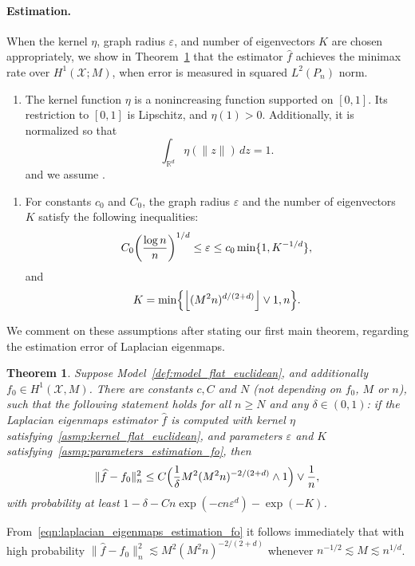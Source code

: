 \documentclass{article}
\newcommand{\Reals}{\mathbb{R}}
\newcommand{\floor}[1]{\left\lfloor #1 \right\rfloor}
\newcommand{\1}{\mathbf{1}}
\newcommand{\Rd}{\Reals^d}
\newcommand{\mc}[1]{\mathcal{#1}}
\newcommand{\wh}[1]{\widehat{#1}}
\theoremstyle{alden}
\theoremstyle{aldenthm}
\newtheorem{theorem}{Theorem}
\theoremstyle{definition}
\theoremstyle{remark}
\begin{document}
\paragraph{Estimation.} When the kernel $\eta$, graph radius $\varepsilon$, and number of eigenvectors $K$ are chosen appropriately, we show in Theorem~\ref{thm:laplacian_eigenmaps_estimation_fo} that the estimator $\wh{f}$ achieves the minimax rate over $H^1(\mc{X};M)$, when error is measured in squared $L^2(P_n)$ norm.
\begin{enumerate}[label=(K\arabic*)]
	\setcounter{enumi}{0}
	\item
	\label{asmp:kernel_flat_euclidean}
	The kernel function $\eta$ is a nonincreasing function supported on $[0,1]$. Its restriction to $[0,1]$ is Lipschitz, and $\eta(1) > 0$. Additionally, it is normalized so that
	\begin{equation*}
	\int_{\Rd} \eta(\|z\|) \,dz = 1.
	\end{equation*}
	and we assume \smash{$\sigma_{\eta} := \frac{1}{d}\int_{\Rd} \|x\|^2 \eta(\|x\|) \,dx < \infty$}.
\end{enumerate}
\begin{enumerate}[label=(P\arabic*)]
	\setcounter{enumi}{0}
	\item 
	\label{asmp:parameters_estimation_fo} 
	For constants $c_0$ and $C_0$, the graph radius $\varepsilon$ and the number of eigenvectors $K$ satisfy the following inequalities:
	\begin{equation}\\
	\label{eqn:radius_fo} 
	C_0\biggl(\frac{\log n}{n}\biggr)^{1/d} \leq \varepsilon \leq c_0\min\{1,K^{-1/d}\},
	\end{equation}
	and 
	\begin{equation}
	\label{eqn:eigenvector_estimation_fo} 
	K = \min\Bigl\{\floor{(M^2n)^{d/(2 + d)}} \vee 1, n\Bigr\}.
	\end{equation}
\end{enumerate}
We comment on these assumptions after stating our first main theorem, regarding the estimation error of Laplacian eigenmaps.
\begin{theorem}
	\label{thm:laplacian_eigenmaps_estimation_fo}
	Suppose Model~\ref{def:model_flat_euclidean}, and additionally $f_0 \in H^1(\mc{X},M)$. There are constants $c,C$ and $N$ (not depending on $f_0$, $M$ or $n$), such that the following statement holds for all $n \geq N$ and any $\delta \in (0,1)$: if the Laplacian eigenmaps estimator $\wh{f}$ is computed with kernel $\eta$ satisfying~\ref{asmp:kernel_flat_euclidean}, and parameters $\varepsilon$ and $K$ satisfying~\ref{asmp:parameters_estimation_fo}, then
	\begin{equation}
	\label{eqn:laplacian_eigenmaps_estimation_fo}
	\|\wh{f} - f_0\|_n^2 \leq C\Bigl(\frac{1}{\delta}M^2(M^2n)^{-2/(2 + d)} \wedge 1\Bigr) \vee \frac{1}{n},
	\end{equation}
	with probability at least $1 - \delta - Cn\exp(-cn\varepsilon^d) - \exp(-K)$.
\end{theorem}
From~\eqref{eqn:laplacian_eigenmaps_estimation_fo} it follows immediately that with high probability $\|\wh{f} - f_0\|_n^2 \lesssim M^2(M^2n)^{-2/(2 + d)}$ whenever $n^{-1/2} \lesssim M \lesssim n^{1/d}$. 
\end{document}
